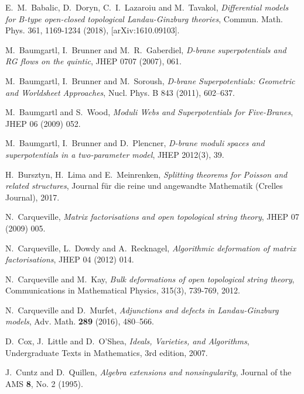 \documentclass[english,letter paper,12pt,leqno]{article}
\theoremstyle{example}
\numberwithin{equation}{section}
\begin{document}

\providecommand{\bysame}{\leavevmode\hbox to3em{\hrulefill}\thinspace}
\providecommand{\href}[2]{#2}
\begin{thebibliography}{BHLS03}
  
E.~M.~Babalic, D.~Doryn, C.~I.~Lazaroiu and M.~Tavakol, \textsl{Differential models for B-type open-closed topological Landau-Ginzburg theories}, Commun. Math. Phys. 361, 1169-1234 (2018), \href{https://arxiv.org/abs/1610.09103}{[arXiv:1610.09103]}.

M.~Baumgartl, I.~Brunner and M.~R.~Gaberdiel, \textsl{D-brane superpotentials and RG flows on the quintic}, JHEP 0707 (2007), 061.

M.~Baumgartl, I.~Brunner and M.~Soroush, \textsl{D-brane Superpotentials: Geometric and Worldsheet Approaches}, Nucl. Phys. B 843 (2011), 602–637.

M.~Baumgartl and S.~Wood, \textsl{Moduli Webs and Superpotentials for Five-Branes}, JHEP 06 (2009) 052.

M.~Baumgartl, I.~Brunner and D.~Plencner, \textsl{D-brane moduli spaces and superpotentials in a two-parameter model}, JHEP 2012(3), 39.

H.~Bursztyn, H.~Lima and E.~Meinrenken, \textsl{Splitting theorems for Poisson and related structures}, Journal f\"ur die reine und angewandte Mathematik (Crelles Journal), 2017.

N.~Carqueville, \textsl{Matrix factorisations and open topological string theory}, JHEP 07  (2009) 005.

N.~Carqueville, L.~Dowdy and A.~Recknagel, \textsl{Algorithmic deformation of matrix factorisations}, JHEP 04 (2012) 014.

N.~Carqueville and M.~Kay, \textsl{Bulk deformations of open topological string theory}, Communications in Mathematical Physics, 315(3), 739-769, 2012.

N.~Carqueville and D.~Murfet, \textsl{Adjunctions and defects in Landau-Ginzburg models}, Adv. Math. \textbf{289} (2016), 480--566.

D.~Cox, J.~Little and D.~O'Shea, \textsl{Ideals, Varieties, and Algorithms}, Undergraduate Texts in Mathematics, 3rd edition, 2007.

J.~Cuntz and D.~Quillen, \textsl{Algebra extensions and nonsingularity}, Journal of the AMS \textbf{8}, No. 2 (1995).


\end{thebibliography}
\end{document}
